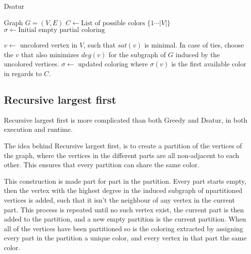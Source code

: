 \documentclass[a4paper]{article}
\begin{document}
\begin{algorithm}[H]
  \caption{Dsatur}
  \begin{algorithmic}[1]
      \REQUIRE Graph $G = (V,E)$
      \STATE $C \leftarrow \text{List of possible colors $\{1 \cdots |V| \}$ }$
      \STATE $\sigma \leftarrow \text{Initial empty partial coloring}$


        \STATE $v \leftarrow$ uncolored vertex in $V$, such that $sat(v)$ is
        minimal. In case of ties, choose the $v$ that also minimizes $deg(v)$
        for the subgraph of $G$ induced by the uncolored vertices.
        \STATE $\sigma \leftarrow$ updated coloring where $\sigma(v)$ is the first
        available color in regards to $C$.
      \ENDFOR
  \end{algorithmic}
\end{algorithm}

\subsection{Recursive largest first}

Recursive largest first is more complicated than both Greedy and Dsatur, in both
execution and runtime. 

The idea behind Recursive largest first, is to create a partition of the
vertices of the graph, where the vertices in the different parts are all
non-adjacent to each other. This ensures that every partition can share the
same color. 

This construction is made part for part in the partition.  Every part starts
empty, then the vertex with the highest degree in the induced subgraph of
npartitioned vertices is added, such that it isn't the neighbour of any vertex
in the current part.  This process is repeated until no such vertex exist, the
current part is then added to the partition, and a new empty partition is the
current partition. When all of the vertices have been partitioned so is the
coloring extracted by assigning every part in the partition a unique color, and
every vertex in that part the same color.
\end{document}
